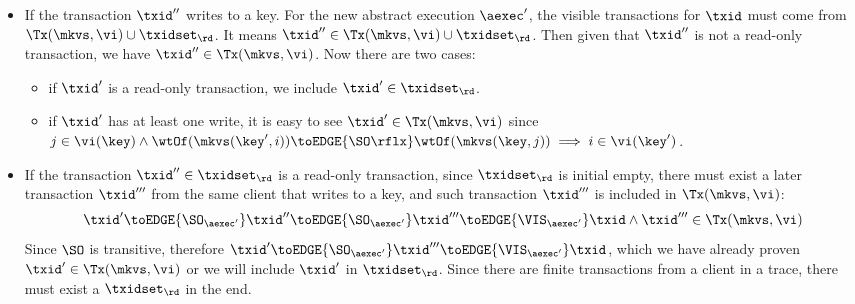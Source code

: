 \begin{itemize}
\item If the transaction \( \txid'' \) writes to a key.
For the new abstract execution \( \aexec' \), the visible transactions for \( \txid \) must come from \( \Tx(\mkvs, \vi) \cup \txidset_\rd \).
It means \( \txid'' \in \Tx(\mkvs, \vi) \cup \txidset_\rd  \).
Then given that \( \txid'' \) is not a read-only transaction, we have \( \txid'' \in \Tx(\mkvs, \vi) \).
Now there are two cases:
\begin{itemize}
    \item if \( \txid' \) is a read-only transaction, we include \( \txid' \in \txidset_{\rd} \).
    \item if \( \txid' \) has at least one write, it is easy to see \( \txid' \in \Tx(\mkvs, \vi) \) since \( j \in \vi(\key) \land \wtOf(\mkvs(\key', i)) \toEDGE{\SO\rflx} \wtOf(\mkvs(\key, j)) \implies i \in \vi(\key') \).
\end{itemize}
\item If the transaction \( \txid'' \in \txidset_\rd \) is a read-only transaction, 
since \( \txidset_\rd \) is initial empty, there must exist a later transaction \( \txid''' \) from the same client that writes to a key,
and such transaction \( \txid''' \) is included in \( \Tx(\mkvs, \vi) \):
\[
    \txid' \toEDGE{\SO_{\aexec'}} \txid'' 
    \toEDGE{\SO_{\aexec'}} \txid''' \toEDGE{\VIS_{\aexec'}} \txid 
    \land \txid''' \in \Tx(\mkvs,\vi)
\]
Since \( \SO \) is transitive, 
therefore \( \txid' \toEDGE{\SO_{\aexec'}} \txid''' \toEDGE{\VIS_{\aexec'}} \txid \),
which we have already proven \( \txid' \in \Tx(\mkvs, \vi) \) or we will include \( \txid' \) in \( \txidset_\rd \).
Since there are finite transactions from a client in a trace, there must exist a \( \txidset_\rd \) in the end.
\end{itemize}


